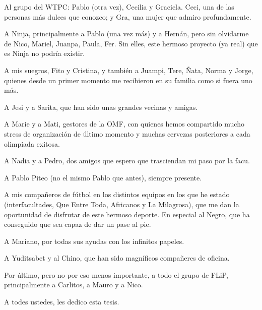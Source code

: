 Al grupo del WTPC: Pablo (otra vez), Cecilia y Graciela. Ceci, una de
las personas más dulces que conozco; y Gra, una mujer que admiro
profundamente.

A Ninja, principalmente a Pablo (una vez más) y a Hernán, pero sin
olvidarme de Nico, Mariel, Juanpa, Paula, Fer. Sin elles, este
hermoso proyecto (ya real) que es Ninja no podría existir.

A mis suegros, Fito y Cristina, y también a Juampi, Tere, Ñata, Norma y Jorge,
quienes desde un primer momento me recibieron en su familia como si
fuera uno más.

A Jesi y a Sarita, que han sido unas grandes vecinas y amigas.

A Marie y a Mati, gestores de la OMF, con quienes hemos compartido
mucho stress de organización de último momento y muchas cervezas
posteriores a cada olimpiada exitosa.

A Nadia y a Pedro, dos amigos que espero que trasciendan mi paso por
la facu.

A Pablo Piteo (no el mismo Pablo que antes), siempre presente.

A mis compañeros de fútbol en los distintos equipos en los que he
estado (interfacultades, Que Entre Toda, Africanos y La Milagrosa),
que me dan la oportunidad de disfrutar de este hermoso deporte. En
especial al Negro, que ha conseguido que sea capaz de dar un pase al
pie.

A Mariano, por todas sus ayudas con los infinitos papeles.

A Yuditsabet y al Chino, que han sido magníficos compañeres de
oficina.

Por último, pero no por eso menos importante, a todo el grupo de FLiP,
principalmente a Carlitos, a Mauro y a Nico.

A todes ustedes, les dedico esta tesis.
